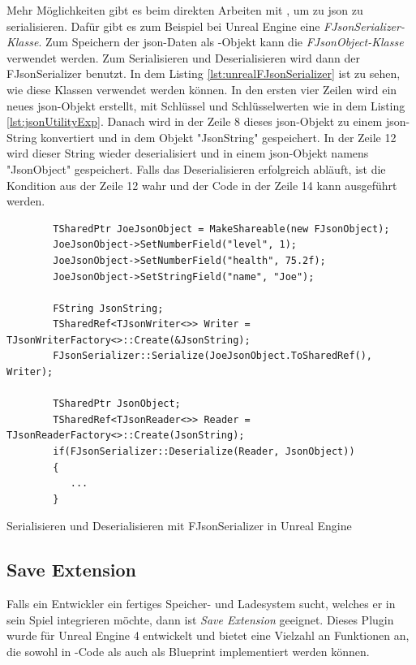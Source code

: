 Mehr Möglichkeiten gibt es beim direkten Arbeiten mit \cpp{}, um zu \ac{json} zu serialisieren. Dafür gibt es zum Beispiel bei Unreal Engine eine \textit{FJsonSerializer-Klasse}.\cite{unrealengineFJsonSerializer} Zum Speichern der \ac{json}-Daten als \cpp{}-Objekt kann die \textit{FJsonObject-Klasse} verwendet werden.\cite{unrealengineFJsonObject} Zum Serialisieren und Deserialisieren wird dann der FJsonSerializer benutzt.\cite{unrealengineFJsonSerializer} In dem Listing \ref{lst:unrealFJsonSerializer} ist zu sehen, wie diese Klassen verwendet werden können. In den ersten vier Zeilen wird ein neues \ac{json}-Objekt erstellt, mit Schlüssel und Schlüsselwerten wie in dem Listing \ref{lst:jsonUtilityExp}. Danach wird in der Zeile 8 dieses \ac{json}-Objekt zu einem \ac{json}-String konvertiert und in dem Objekt "JsonString" gespeichert. In der Zeile 12 wird dieser String wieder deserialisiert und in einem \ac{json}-Objekt namens "JsonObject" gespeichert. Falls das Deserialisieren erfolgreich abläuft, ist die Kondition aus der Zeile 12 wahr und der Code in der Zeile 14 kann ausgeführt werden.\cite{wraiythUsingJson1}\cite{wraiythUsingJson2}

\begin{listing}[htp]
    \begin{verbatim}
        TSharedPtr JoeJsonObject = MakeShareable(new FJsonObject);
        JoeJsonObject->SetNumberField("level", 1);
        JoeJsonObject->SetNumberField("health", 75.2f);
        JoeJsonObject->SetStringField("name", "Joe");
        
        FString JsonString;
        TSharedRef<TJsonWriter<>> Writer = TJsonWriterFactory<>::Create(&JsonString);
        FJsonSerializer::Serialize(JoeJsonObject.ToSharedRef(), Writer);   
        
        TSharedPtr JsonObject;
        TSharedRef<TJsonReader<>> Reader = TJsonReaderFactory<>::Create(JsonString);
        if(FJsonSerializer::Deserialize(Reader, JsonObject)) 
        {
           ...
        }
    \end{verbatim}
    \caption{Serialisieren und Deserialisieren mit FJsonSerializer in Unreal Engine \cite{wraiythUsingJson1}\cite{wraiythUsingJson2}}
    \label{lst:unrealFJsonSerializer}
\end{listing}



\subsection{Save Extension}
Falls ein Entwickler ein fertiges Speicher- und Ladesystem sucht, welches er in sein Spiel integrieren möchte, dann ist \textit{Save Extension} geeignet. Dieses Plugin wurde für Unreal Engine 4 entwickelt und bietet eine Vielzahl an Funktionen an, die sowohl in \cpp{}-Code als auch als Blueprint implementiert werden können.\cite{unrealengineSaveExtension}

